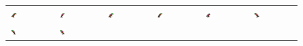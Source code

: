 \documentclass[book.tex]{subfiles}
\begin{document}
\begin{figure}[H]
\begin{table}[H]
\begin{tabularx}{\textwidth}[c]{|XXXXXX|}
  \includegraphics[width=0.17\textwidth]{screenshots_300dpi/game/sprite3e.png} &
  \includegraphics[width=0.17\textwidth]{screenshots_300dpi/game/sprite3f.png} &
  \includegraphics[width=0.17\textwidth]{screenshots_300dpi/game/sprite3g.png} & 
  \includegraphics[width=0.17\textwidth]{screenshots_300dpi/game/sprite3h.png} &   
  \includegraphics[width=0.17\textwidth]{screenshots_300dpi/game/sprite4a.png} &
  \includegraphics[width=0.17\textwidth]{screenshots_300dpi/game/sprite4b.png} \\    
  \includegraphics[width=0.17\textwidth]{screenshots_300dpi/game/sprite4c.png} &
  \includegraphics[width=0.17\textwidth]{screenshots_300dpi/game/sprite4d.png} &

\end{tabularx}
\end{table}
\end{figure}
\end{document}
